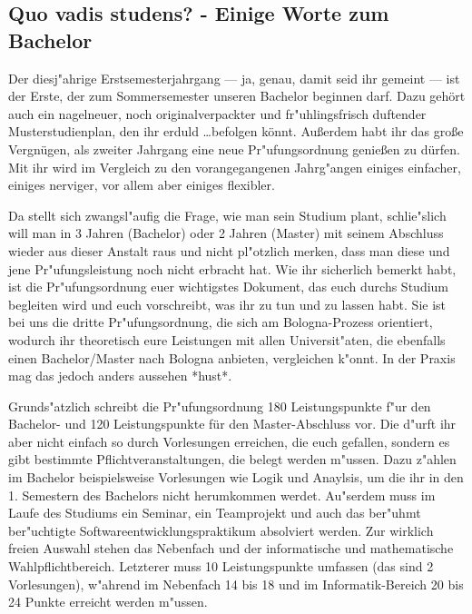 \subsection{Quo vadis studens? - Einige Worte zum Bachelor}

Der diesj"ahrige Erstsemesterjahrgang --- ja, genau, damit seid ihr
gemeint --- ist der Erste, der zum Sommersemester unseren Bachelor
beginnen darf. Dazu gehört auch ein nagelneuer, noch originalverpackter
und fr"uhlingsfrisch duftender Musterstudienplan, den ihr
erduld \dots befolgen könnt.
Außerdem habt ihr das große Vergnügen, als zweiter Jahrgang eine neue 
Pr"ufungsordnung genießen zu dürfen. Mit ihr  wird im Vergleich zu den vorangegangenen
Jahrg"angen einiges einfacher, einiges nerviger, vor allem aber einiges flexibler. 

Da stellt sich
zwangsl"aufig die Frage, wie man sein Studium plant, schlie"slich will
man in 3 Jahren (Bachelor) oder 2 Jahren (Master) mit seinem
Abschluss wieder aus dieser Anstalt raus und nicht pl"otzlich merken, dass man diese und jene
Pr"ufungsleistung noch nicht erbracht hat. 
Wie ihr sicherlich bemerkt habt, ist die Pr"ufungsordnung euer wichtigstes Dokument, das euch
durchs Studium begleiten wird und euch vorschreibt, was ihr zu tun und zu lassen habt. Sie ist bei
uns die dritte Pr"ufungsordnung, die sich am Bologna-Prozess orientiert, wodurch ihr theoretisch
eure Leistungen mit allen Universit"aten, die ebenfalls einen Bachelor/Master nach Bologna
anbieten, vergleichen k"onnt. In der Praxis mag das jedoch anders aussehen *hust*.

Grunds"atzlich schreibt die Pr"ufungsordnung 180 Leistungspunkte f"ur
den Bachelor- und 120 Leistungspunkte für den Master-Abschluss vor.
Die d"urft ihr aber nicht einfach so durch Vorlesungen erreichen, die euch gefallen, sondern es gibt
bestimmte Pflichtveranstaltungen, die belegt werden m"ussen. Dazu
z"ahlen im Bachelor beispielsweise Vorlesungen wie Logik und Anaylsis, um die
ihr in den 1. Semestern des Bachelors nicht herumkommen werdet. Au"serdem muss im Laufe des Studiums ein Seminar, ein
Teamprojekt und auch das ber"uhmt ber"uchtigte Softwareentwicklungspraktikum absolviert werden.
Zur wirklich freien Auswahl stehen das Nebenfach und der informatische und mathematische
Wahlpflichtbereich. Letzterer muss 10 Leistungspunkte umfassen (das sind 2 Vorlesungen),
w"ahrend im Nebenfach 14 bis 18 und im Informatik-Bereich 20 bis 24 Punkte erreicht werden
m"ussen.

